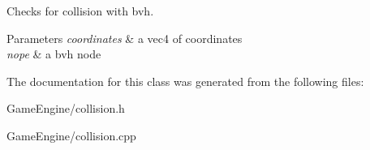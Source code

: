 Checks for collision with bvh. 


\begin{DoxyParams}{Parameters}
{\em coordinates} & a vec4 of coordinates \\
\hline
{\em nope} & a bvh node \\
\hline
\end{DoxyParams}


The documentation for this class was generated from the following files\+:\begin{DoxyCompactItemize}
\item 
Game\+Engine/collision.\+h\item 
Game\+Engine/collision.\+cpp\end{DoxyCompactItemize}
